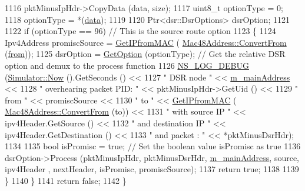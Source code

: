 \begin{DoxyCode}
1116       pktMinusIpHdr->CopyData (data, size);
1117       uint8\_t optionType = 0;
1118       optionType = *(\hyperlink{topology-example-sim_8cc_a26c65296e316af77b787dc77469bb2a4}{data});
1119 
1120       Ptr<dsr::DsrOptions> dsrOption;
1121 
1122       \textcolor{keywordflow}{if} (optionType == 96)        \textcolor{comment}{// This is the source route option}
1123         \{
1124           Ipv4Address promiscSource = \hyperlink{classns3_1_1dsr_1_1DsrRouting_a5914e79eec0e5e33be08f55321e8aaea}{GetIPfromMAC} (
      \hyperlink{classns3_1_1Mac48Address_a911ce13603a9ef837545a032b6523ae4}{Mac48Address::ConvertFrom} (\hyperlink{lte__amc_8m_a1b4c81ff74eb1a626b5ade44c81004b3}{from}));
1125           dsrOption = \hyperlink{classns3_1_1dsr_1_1DsrRouting_a5cdb4c336831a3158c6ba12d226a198e}{GetOption} (optionType);       \textcolor{comment}{// Get the relative DSR option and demux to
       the process function}
1126           \hyperlink{group__logging_ga413f1886406d49f59a6a0a89b77b4d0a}{NS\_LOG\_DEBUG} (\hyperlink{classns3_1_1Simulator_ac3178fa975b419f7875e7105be122800}{Simulator::Now} ().GetSeconds () <<
1127                         \textcolor{stringliteral}{" DSR node "} << \hyperlink{classns3_1_1dsr_1_1DsrRouting_a73182b5edee2d8460f28855e058fc9a0}{m\_mainAddress} <<
1128                         \textcolor{stringliteral}{" overhearing packet PID: "} << pktMinusIpHdr->GetUid () <<
1129                         \textcolor{stringliteral}{" from "} << promiscSource <<
1130                         \textcolor{stringliteral}{" to "} << \hyperlink{classns3_1_1dsr_1_1DsrRouting_a5914e79eec0e5e33be08f55321e8aaea}{GetIPfromMAC} (
      \hyperlink{classns3_1_1Mac48Address_a911ce13603a9ef837545a032b6523ae4}{Mac48Address::ConvertFrom} (to)) <<
1131                         \textcolor{stringliteral}{" with source IP "} << ipv4Header.GetSource () <<
1132                         \textcolor{stringliteral}{" and destination IP "} << ipv4Header.GetDestination () <<
1133                         \textcolor{stringliteral}{" and packet : "} << *pktMinusDsrHdr);
1134 
1135           \textcolor{keywordtype}{bool} isPromisc = \textcolor{keyword}{true};                     \textcolor{comment}{// Set the boolean value isPromisc as true}
1136           dsrOption->Process (pktMinusIpHdr, pktMinusDsrHdr, \hyperlink{classns3_1_1dsr_1_1DsrRouting_a73182b5edee2d8460f28855e058fc9a0}{m\_mainAddress}, source, ipv4Header
      , nextHeader, isPromisc, promiscSource);
1137           \textcolor{keywordflow}{return} \textcolor{keyword}{true};
1138 
1139         \}
1140     \}
1141   \textcolor{keywordflow}{return} \textcolor{keyword}{false};
1142 \}
\end{DoxyCode}


